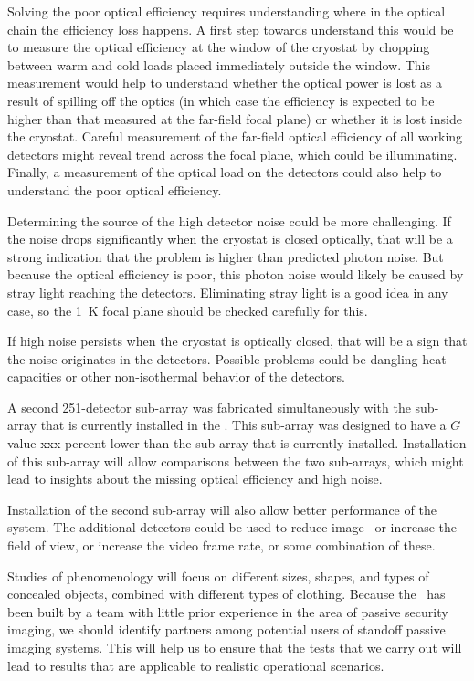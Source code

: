 Solving the poor optical efficiency requires understanding where in the optical chain the efficiency loss happens.
A first step towards understand this would be to measure the optical efficiency at the window of the cryostat by chopping between warm and cold loads placed immediately outside the window.
This measurement would help to understand whether the optical power is lost as a result of spilling off the optics (in which case the efficiency is expected to be higher than that measured at the far-field focal plane) or whether it is lost inside the cryostat.
Careful measurement of the far-field optical efficiency of all working detectors might reveal trend across the focal plane, which could be illuminating.
Finally, a measurement of the optical load on the detectors could also help to understand the poor optical efficiency.

Determining the source of the high detector noise could be more challenging.
If the noise drops significantly when the cryostat is closed optically, that will be a strong indication that the problem is higher than predicted photon noise.
But because the optical efficiency is poor, this photon noise would likely be caused by stray light reaching the detectors.
Eliminating stray light is a good idea in any case, so the \SI{1}{\K} focal plane should be checked carefully for this.

If high noise persists when the cryostat is optically closed, that will be a sign that the noise originates in the detectors.
Possible problems could be dangling heat capacities or other non-isothermal behavior of the detectors.

A second 251-detector sub-array was fabricated simultaneously with the sub-array that is currently installed in the \Imager.
This sub-array was designed to have a $G$ value xxx percent lower than the sub-array that is currently installed.
Installation of this sub-array will allow comparisons between the two sub-arrays, which might lead to insights about the missing optical efficiency and high noise.

Installation of the second sub-array will also allow better performance of the system.
The additional detectors could be used to reduce image \NETD\, or increase the field of view, or increase the video frame rate, or some combination of these.

Studies of phenomenology will focus on different sizes, shapes, and types of concealed objects, combined with different types of clothing.
Because the \Imager\ has been built by a team with little prior experience in the area of passive security imaging, we should identify partners among potential users of standoff passive imaging systems.
This will help us to ensure that the tests that we carry out will lead to results that are applicable to realistic operational scenarios.

